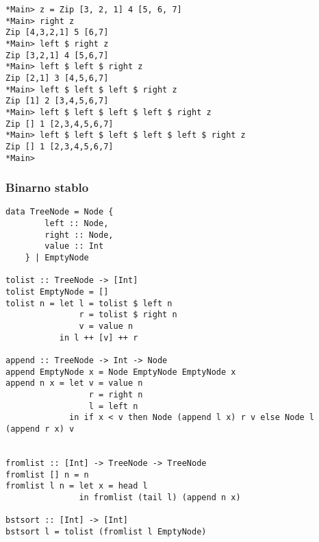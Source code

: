 \documentclass{beamer}
\begin{document}
\begin{frame}[fragile]
\begin{lstlisting}
*Main> z = Zip [3, 2, 1] 4 [5, 6, 7]
*Main> right z 
Zip [4,3,2,1] 5 [6,7]
*Main> left $ right z 
Zip [3,2,1] 4 [5,6,7]
*Main> left $ left $ right z 
Zip [2,1] 3 [4,5,6,7]
*Main> left $ left $ left $ right z 
Zip [1] 2 [3,4,5,6,7]
*Main> left $ left $ left $ left $ right z 
Zip [] 1 [2,3,4,5,6,7]
*Main> left $ left $ left $ left $ left $ right z 
Zip [] 1 [2,3,4,5,6,7]
*Main> 
\end{lstlisting}
\end{frame}


\begin{frame}[fragile]
\frametitle{Binarno stablo}
\begin{lstlisting}
data TreeNode = Node {
        left :: Node,
        right :: Node,
        value :: Int
    } | EmptyNode

tolist :: TreeNode -> [Int]
tolist EmptyNode = []
tolist n = let l = tolist $ left n
               r = tolist $ right n
               v = value n
           in l ++ [v] ++ r

append :: TreeNode -> Int -> Node
append EmptyNode x = Node EmptyNode EmptyNode x
append n x = let v = value n
                 r = right n
                 l = left n
             in if x < v then Node (append l x) r v else Node l (append r x) v


fromlist :: [Int] -> TreeNode -> TreeNode
fromlist [] n = n
fromlist l n = let x = head l
               in fromlist (tail l) (append n x)

bstsort :: [Int] -> [Int]
bstsort l = tolist (fromlist l EmptyNode)
\end{lstlisting}
\end{frame}



\end{document}
